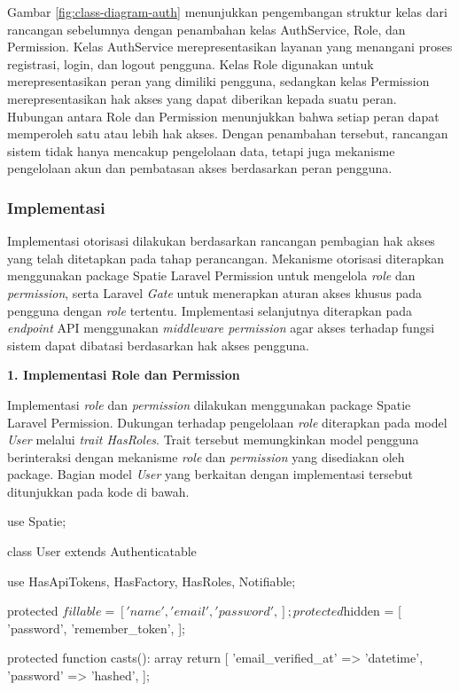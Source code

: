 Gambar \ref{fig:class-diagram-auth} menunjukkan pengembangan struktur kelas dari rancangan sebelumnya dengan penambahan kelas AuthService, Role, dan Permission. Kelas AuthService merepresentasikan layanan yang menangani proses registrasi, login, dan logout pengguna. Kelas Role digunakan untuk merepresentasikan peran yang dimiliki pengguna, sedangkan kelas Permission merepresentasikan hak akses yang dapat diberikan kepada suatu peran. Hubungan antara Role dan Permission menunjukkan bahwa setiap peran dapat memperoleh satu atau lebih hak akses. Dengan penambahan tersebut, rancangan sistem tidak hanya mencakup pengelolaan data, tetapi juga mekanisme pengelolaan akun dan pembatasan akses berdasarkan peran pengguna.

\subsubsection{Implementasi}

Implementasi otorisasi dilakukan berdasarkan rancangan pembagian hak akses yang telah ditetapkan pada tahap perancangan. Mekanisme otorisasi diterapkan menggunakan package Spatie Laravel Permission untuk mengelola \textit{role} dan \textit{permission}, serta Laravel \textit{Gate} untuk menerapkan aturan akses khusus pada pengguna dengan \textit{role} tertentu. Implementasi selanjutnya diterapkan pada \textit{endpoint} API menggunakan \textit{middleware permission} agar akses terhadap fungsi sistem dapat dibatasi berdasarkan hak akses pengguna.

\vspace{0.5em}
\noindent\textbf{1. Implementasi Role dan Permission}
\vspace{0.5em}

Implementasi \textit{role} dan \textit{permission} dilakukan menggunakan package Spatie Laravel Permission. Dukungan terhadap pengelolaan \textit{role} diterapkan pada model \textit{User} melalui \textit{trait HasRoles}. Trait tersebut memungkinkan model pengguna berinteraksi dengan mekanisme \textit{role} dan \textit{permission} yang disediakan oleh package. Bagian model \textit{User} yang berkaitan dengan implementasi tersebut ditunjukkan pada kode di bawah.

\begin{code}
\begin{ignasicblock}
use Spatie\Permission\Traits\HasRoles;

class User extends Authenticatable
{
    use HasApiTokens, HasFactory, HasRoles, Notifiable;

    protected $fillable = [
        'name',
        'email',
        'password',
    ];

    protected $hidden = [
        'password',
        'remember_token',
    ];

    protected function casts(): array
    {
        return [
            'email_verified_at' => 'datetime',
            'password' => 'hashed',
        ];
    }
}
\end{ignasicblock}
\end{code}

